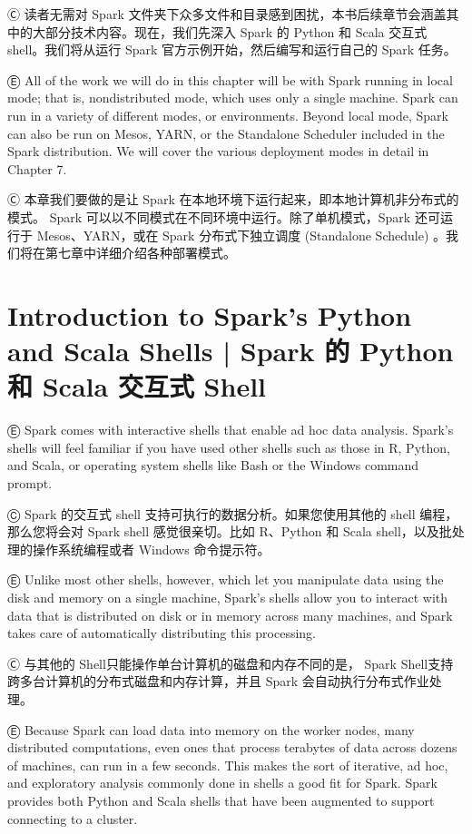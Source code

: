 Ⓒ 读者无需对 Spark 文件夹下众多文件和目录感到困扰，本书后续章节会涵盖其中的大部分技术内容。现在，我们先深入 Spark 的 Python 和 Scala 交互式 shell。我们将从运行 Spark 官方示例开始，然后编写和运行自己的 Spark 任务。

Ⓔ \textcolor{etc} {All of the work we will do in this chapter will be with Spark running in local mode; that is, nondistributed mode, which uses only a single machine. Spark can run in a variety of different modes, or environments. Beyond local mode, Spark can also be run on Mesos, YARN, or the Standalone Scheduler included in the Spark distribution. We will cover the various deployment modes in detail in Chapter 7.}

Ⓒ 本章我们要做的是让 Spark 在本地环境下运行起来，即本地计算机非分布式的模式。 Spark 可以以不同模式在不同环境中运行。除了单机模式，Spark 还可运行于 Mesos、YARN，或在 Spark 分布式下独立调度 (Standalone Schedule) 。我们将在第七章中详细介绍各种部署模式。

\section{Introduction to Spark's Python and Scala Shells  |  Spark 的 Python 和 Scala 交互式 Shell}\label{introduction-to-sparks-python-and-scala-shells}

Ⓔ \textcolor{etc}{Spark comes with interactive shells that enable ad hoc data analysis. Spark's shells will feel familiar if you have used other shells such as those in R, Python, and Scala, or operating system shells like Bash or the Windows command prompt.}

Ⓒ Spark 的交互式 shell 支持可执行的数据分析。如果您使用其他的 shell
编程，那么您将会对 Spark shell 感觉很亲切。比如 R、Python 和 Scala
shell，以及批处理的操作系统编程或者 Windows 命令提示符。

Ⓔ \textcolor{etc}{Unlike most other shells, however, which let you manipulate data using the disk and memory on a single machine, Spark's shells allow you to interact with data that is distributed on disk or in memory across many machines, and Spark takes care of automatically distributing this processing.}

Ⓒ 与其他的 Shell只能操作单台计算机的磁盘和内存不同的是， Spark Shell支持跨多台计算机的分布式磁盘和内存计算，并且 Spark 会自动执行分布式作业处理。

Ⓔ \textcolor{etc}{Because Spark can load data into memory on the worker nodes, many distributed computations, even ones that process terabytes of data across dozens of machines, can run in a few seconds. This makes the sort of iterative, ad hoc, and exploratory analysis commonly done in shells a good fit for Spark. Spark provides both Python and Scala shells that have been augmented to support connecting to a cluster.}

